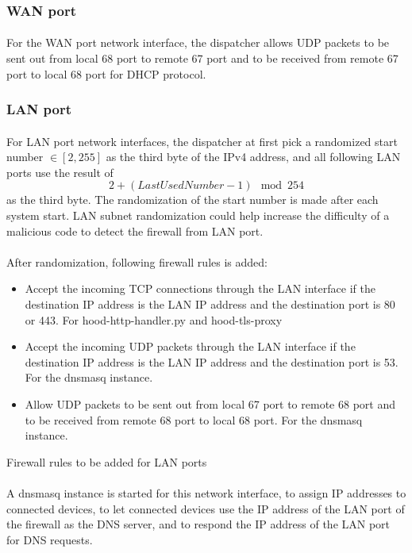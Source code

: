 \documentclass[mscthesis]{usiinfthesis}
\begin{document}
\subsubsection{WAN port}
\paragraph{}
For the WAN port network interface, the dispatcher allows UDP packets to be sent out from local 68 port to remote 67 port and to be received from remote 67 port to local 68 port for DHCP protocol.
\subsubsection{LAN port}
\paragraph{}
For LAN port network interfaces, the dispatcher at first pick a randomized start number \(\in [2, 255]\) as the third byte of the IPv4 address, and all following LAN ports use the result of \[2 + (Last Used Number - 1) \mod 254\] as the third byte. The randomization of the start number is made after each system start. LAN subnet randomization could help increase the difficulty of a malicious code to detect the firewall from LAN port.
\paragraph{}
After randomization, following firewall rules is added:
\begin{table}[H]
  \begin{itemize}
    \item Accept the incoming TCP connections through the LAN interface if the destination IP address is the LAN IP address and the destination port is 80 or 443. For hood-http-handler.py and hood-tls-proxy
    \item Accept the incoming UDP packets through the LAN interface if the destination IP address is the LAN IP address and the destination port is 53. For the dnsmasq instance.
    \item Allow UDP packets to be sent out from local 67 port to remote 68 port and to be received from remote 68 port to local 68 port. For the dnsmasq instance.
  \end{itemize}
  \caption{Firewall rules to be added for LAN ports}
  \label{lst:LAN-rules}
\end{table}
\paragraph{}
A dnsmasq instance is started for this network interface, to assign IP addresses to connected devices, to let connected devices use the IP address of the LAN port of the firewall as the DNS server, and to respond the IP address of the LAN port for DNS requests.
\end{document}
